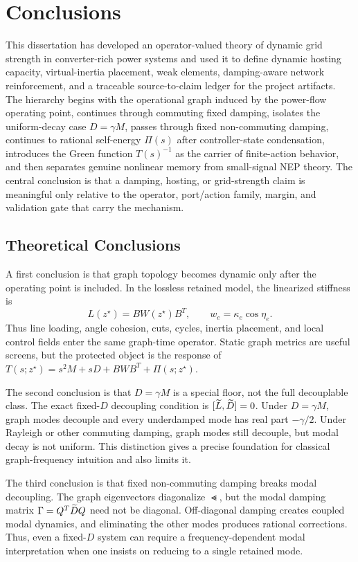 \chapter{Conclusions}

This dissertation has developed an operator-valued theory of dynamic grid
strength in converter-rich power systems and used it to define dynamic hosting
capacity, virtual-inertia placement, weak elements, damping-aware network
reinforcement, and a traceable source-to-claim ledger for the project
artifacts. The hierarchy begins with the operational graph induced by the
power-flow operating point, continues through commuting fixed damping, isolates
the uniform-decay case \(D=\gamma M\), passes through fixed non-commuting
damping, continues to rational self-energy \(\Pi(s)\) after controller-state
condensation, introduces the Green function \(T(s)^{-1}\) as the carrier of
finite-action behavior, and then separates genuine nonlinear memory from
small-signal NEP theory. The central conclusion is that a damping, hosting, or
grid-strength claim is meaningful only relative to the operator, port/action
family, margin, and validation gate that carry the mechanism.

\section{Theoretical Conclusions}

A first conclusion is that graph topology becomes dynamic only after the
operating point is included. In the lossless retained model, the linearized
stiffness is
\[
  L(z^\star)=B W(z^\star)B^T,\qquad
  w_e=\kappa_e\cos\eta_e .
\]
Thus line loading, angle cohesion, cuts, cycles, inertia placement, and local
control fields enter the same graph-time operator. Static graph metrics are
useful screens, but the protected object is the response of
\(T(s;z^\star)=s^2M+sD+BWB^T+\Pi(s;z^\star)\).

The second conclusion is that \(D=\gamma M\) is a special floor, not the full
decouplable class. The exact fixed-\(D\) decoupling condition is
\([\widetilde L,\widetilde D]=0\). Under \(D=\gamma M\), graph modes decouple and every
underdamped mode has real part \(-\gamma/2\). Under Rayleigh or other
commuting damping, graph modes still decouple, but modal decay is not uniform.
This distinction gives a precise foundation for classical graph-frequency
intuition and also limits it.

The third conclusion is that fixed non-commuting damping breaks modal
decoupling. The graph eigenvectors diagonalize \(\Lt\), but the modal damping
matrix \(\Gamma=Q^T\widetilde D Q\) need not be diagonal. Off-diagonal damping creates
coupled modal dynamics, and eliminating the other modes produces rational
corrections. Thus, even a fixed-\(D\) system can require a frequency-dependent
modal interpretation when one insists on reducing to a single retained mode.

